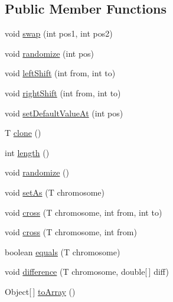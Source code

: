 \subsection*{Public Member Functions}
\begin{DoxyCompactItemize}
\item 
void \hyperlink{interfacejenes_1_1chromosome_1_1_chromosome_3_01_t_01extends_01_chromosome_01_4_ad3a9fc2dbf63e0fb2b486a08ace2a6e8}{swap} (int pos1, int pos2)
\item 
void \hyperlink{interfacejenes_1_1chromosome_1_1_chromosome_3_01_t_01extends_01_chromosome_01_4_a1afc86af7df16d75b9fceaac91b57216}{randomize} (int pos)
\item 
void \hyperlink{interfacejenes_1_1chromosome_1_1_chromosome_3_01_t_01extends_01_chromosome_01_4_ab04d66867a48c5ac9eafe26e0473d326}{left\-Shift} (int from, int to)
\item 
void \hyperlink{interfacejenes_1_1chromosome_1_1_chromosome_3_01_t_01extends_01_chromosome_01_4_a26ee95b79d8c4012acffd9d26ab1b620}{right\-Shift} (int from, int to)
\item 
void \hyperlink{interfacejenes_1_1chromosome_1_1_chromosome_3_01_t_01extends_01_chromosome_01_4_a7da893369a724b9bdde694ffd07e05ef}{set\-Default\-Value\-At} (int pos)
\item 
T \hyperlink{interfacejenes_1_1chromosome_1_1_chromosome_3_01_t_01extends_01_chromosome_01_4_a853c4aaab715bdcc4f89ed84dfbe1f00}{clone} ()
\item 
int \hyperlink{interfacejenes_1_1chromosome_1_1_chromosome_3_01_t_01extends_01_chromosome_01_4_a29f012dd3205c9bdb3fe3b749aa7c927}{length} ()
\item 
void \hyperlink{interfacejenes_1_1chromosome_1_1_chromosome_3_01_t_01extends_01_chromosome_01_4_ab54ea692387c9a052c6e47191f02f600}{randomize} ()
\item 
void \hyperlink{interfacejenes_1_1chromosome_1_1_chromosome_3_01_t_01extends_01_chromosome_01_4_a07cb1cba99dd05811c5f5530ffc0642e}{set\-As} (T chromosome)
\item 
void \hyperlink{interfacejenes_1_1chromosome_1_1_chromosome_3_01_t_01extends_01_chromosome_01_4_a3865a9034e0582dc11b6dc6cbd9b21da}{cross} (T chromosome, int from, int to)
\item 
void \hyperlink{interfacejenes_1_1chromosome_1_1_chromosome_3_01_t_01extends_01_chromosome_01_4_a56f3d45ef9dced649f9050d736e6e753}{cross} (T chromosome, int from)
\item 
boolean \hyperlink{interfacejenes_1_1chromosome_1_1_chromosome_3_01_t_01extends_01_chromosome_01_4_afa9dc889ff75457240750c802a5024db}{equals} (T chromosome)
\item 
void \hyperlink{interfacejenes_1_1chromosome_1_1_chromosome_3_01_t_01extends_01_chromosome_01_4_a7f4ba26864bc54607635b608be6a1e1d}{difference} (T chromosome, double\mbox{[}$\,$\mbox{]} diff)
\item 
Object\mbox{[}$\,$\mbox{]} \hyperlink{interfacejenes_1_1chromosome_1_1_chromosome_3_01_t_01extends_01_chromosome_01_4_aaf3edb9b3b7265edf5e754ca2b41603e}{to\-Array} ()
\end{DoxyCompactItemize}


